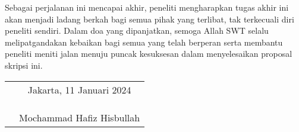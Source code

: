 Sebagai perjalanan ini mencapai akhir, peneliti mengharapkan tugas akhir ini akan 
menjadi ladang berkah bagi semua pihak yang terlibat, tak terkecuali diri peneliti 
sendiri. Dalam doa yang dipanjatkan, semoga Allah SWT selalu melipatgandakan kebaikan 
bagi semua yang telah berperan serta membantu peneliti meniti jalan menuju puncak 
kesuksesan dalam menyelesaikan proposal skripsi ini.

\vspace{2cm}

\begin{tabular}{p{7.5cm}c}
	&Jakarta, 11 Januari 2024\\
	&\\
	&\\
	&\\
	&Mochammad Hafiz Hisbullah
\end{tabular}
